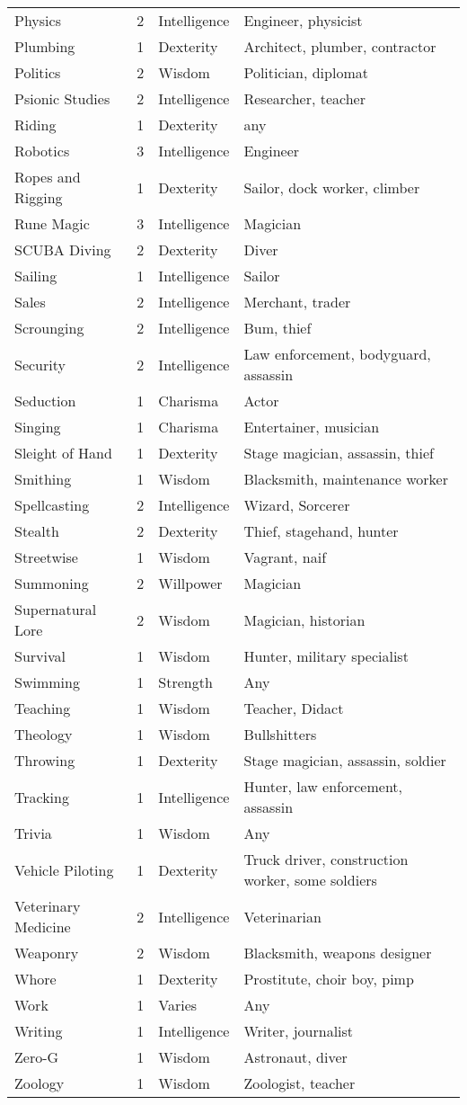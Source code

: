 \documentclass[twoside]{book}
\begin{document}
\begin{longtable}{p{1.25in}llp{12em}}
      \raggedright Physics&2&Intelligence&Engineer, physicist\tabularnewline
      \raggedright Plumbing&1&Dexterity&Architect, plumber, contractor\tabularnewline
      \raggedright Politics&2&Wisdom&Politician, diplomat\tabularnewline
      \raggedright Psionic Studies&2&Intelligence&Researcher, teacher\tabularnewline
      \raggedright Riding&1&Dexterity&any\tabularnewline
      \raggedright Robotics&3&Intelligence&Engineer\tabularnewline
      \raggedright Ropes and Rigging&1&Dexterity&Sailor, dock worker, climber\tabularnewline
      \raggedright Rune Magic&3&Intelligence&Magician\tabularnewline
      \raggedright SCUBA Diving&2&Dexterity&Diver\tabularnewline
      \raggedright Sailing&1&Intelligence&Sailor\tabularnewline
      \raggedright Sales&2&Intelligence&Merchant, trader\tabularnewline
      \raggedright Scrounging&2&Intelligence&Bum, thief\tabularnewline
      \raggedright Security&2&Intelligence&Law enforcement, bodyguard, assassin\tabularnewline
      \raggedright Seduction&1&Charisma&Actor\tabularnewline
      \raggedright Singing&1&Charisma&Entertainer, musician\tabularnewline
      \raggedright Sleight of Hand&1&Dexterity&Stage magician, assassin, thief\tabularnewline
      \raggedright Smithing&1&Wisdom&Blacksmith, maintenance worker\tabularnewline
      \raggedright Spellcasting&2&Intelligence&Wizard, Sorcerer\tabularnewline
      \raggedright Stealth&2&Dexterity&Thief, stagehand, hunter\tabularnewline
      \raggedright Streetwise&1&Wisdom&Vagrant, naif\tabularnewline
      \raggedright Summoning&2&Willpower&Magician\tabularnewline
      \raggedright Supernatural Lore&2&Wisdom&Magician, historian\tabularnewline
      \raggedright Survival&1&Wisdom&Hunter, military specialist\tabularnewline
      \raggedright Swimming&1&Strength&Any\tabularnewline
      \raggedright Teaching&1&Wisdom&Teacher, Didact\tabularnewline
      \raggedright Theology&1&Wisdom&Bullshitters\tabularnewline
      \raggedright Throwing&1&Dexterity&Stage magician, assassin, soldier\tabularnewline
      \raggedright Tracking&1&Intelligence&Hunter, law enforcement, assassin\tabularnewline
      \raggedright Trivia&1&Wisdom&Any\tabularnewline
      \raggedright Vehicle Piloting&1&Dexterity&Truck driver, construction worker, some soldiers\tabularnewline
      \raggedright Veterinary Medicine&2&Intelligence&Veterinarian\tabularnewline
      \raggedright Weaponry&2&Wisdom&Blacksmith, weapons designer\tabularnewline
      \raggedright Whore&1&Dexterity&Prostitute, choir boy, pimp\tabularnewline
      \raggedright Work&1&Varies&Any\tabularnewline
      \raggedright Writing&1&Intelligence&Writer, journalist\tabularnewline
      \raggedright Zero-G&1&Wisdom&Astronaut, diver\tabularnewline
      \raggedright Zoology&1&Wisdom&Zoologist, teacher\tabularnewline
      
\end{longtable}
    
\end{document}
